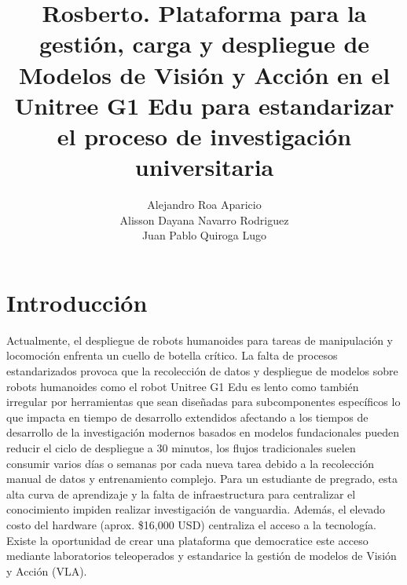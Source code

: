 \documentclass[stu,12pt,floatsintext]{apa7}
\title{Rosberto. Plataforma para la gestión, carga y despliegue de Modelos de Visión y Acción en el Unitree G1 Edu para estandarizar el proceso de investigación universitaria}
\author{Alejandro Roa Aparicio \\ Alisson Dayana Navarro Rodriguez \\ Juan Pablo Quiroga Lugo}
\affiliation{Universidad EAN}
\begin{document}
\maketitle

\tableofcontents

\clearpage
\listoffigures

\clearpage
\listoftables
\clearpage


\printglossary[type=\acronymtype]
\clearpage

\section{Introducción}





Actualmente, el despliegue de robots humanoides para tareas de manipulación y locomoción enfrenta un cuello de botella crítico. La falta de procesos estandarizados provoca que la recolección de datos y despliegue de modelos sobre robots humanoides como el robot Unitree G1 Edu es lento como también irregular por herramientas que sean diseñadas para subcomponentes específicos \parencite{cadene2026lerobotopensourcelibraryendtoend} lo que impacta en tiempo de desarrollo extendidos afectando a los tiempos de desarrollo de la investigación 
modernos basados en modelos fundacionales pueden reducir el ciclo de despliegue a 30 minutos,
los flujos tradicionales suelen consumir varios días o semanas por cada nueva tarea debido a la
recolección manual de datos y entrenamiento complejo.
Para un estudiante de pregrado, esta alta curva de aprendizaje y la falta de infraestructura para
centralizar el conocimiento impiden realizar investigación de vanguardia. Además, el elevado costo
del hardware (aprox. \$16,000 USD) centraliza el acceso a la tecnología. Existe la oportunidad de
crear una plataforma que democratice este acceso mediante laboratorios teleoperados y
estandarice la gestión de modelos de Visión y Acción (VLA).


\end{document}
